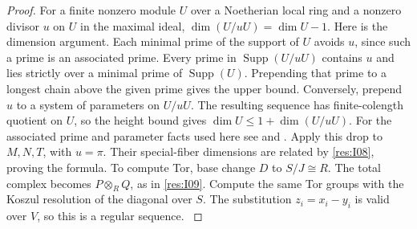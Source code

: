 \begin{proof}
For a finite nonzero module \(U\) over a Noetherian local ring
and a nonzero divisor \(u\) on \(U\) in the maximal ideal,
\(\dim(U/uU)=\dim U-1\). Here is the dimension argument.
Each minimal prime of the support of \(U\) avoids \(u\),
since such a prime is an associated prime. Every prime
in \(\operatorname{Supp}(U/uU)\) contains \(u\) and lies
strictly over a minimal prime of \(\operatorname{Supp}(U)\).
Prepending that prime to a longest chain above the given prime
gives the upper bound. Conversely, prepend \(u\) to a system of
parameters on \(U/uU\). The resulting sequence has finite-colength
quotient on \(U\), so the height bound gives
\(\dim U\le 1+\dim(U/uU)\). For the associated prime and parameter
facts used here see \cite[Chapter 6]{core} and
\cite[ALG-05-C03-S01]{p103}.
Apply this drop to \(M,N,T\), with \(u=\pi\). Their special-fiber
dimensions are related by \ref{res:I08}, proving the formula.
To compute Tor, base change \(D\) to \(S/J\cong R\). The total
complex becomes \(P\otimes_R Q\), as in \ref{res:I09}. Compute
the same Tor groups with the Koszul resolution of the diagonal
over \(S\). The substitution \(z_i=x_i-y_i\) is valid over \(V\),
so this is a regular sequence. \cite[Chapter V, \S B.5, Lemma 1]{serre-local}
\end{proof}


